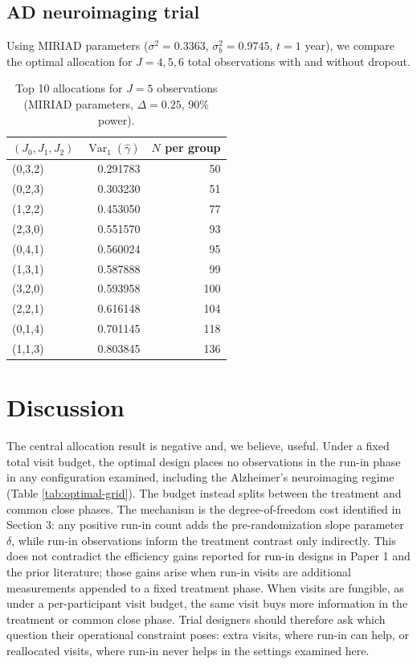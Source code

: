 \documentclass[
  11pt,
]{article}
\begin{document}
\subsection{AD neuroimaging trial}\label{ad-neuroimaging-trial}

Using MIRIAD parameters (\(\sigma^2 = 0.3363\),
\(\sigma_b^2 = 0.9745\), \(t = 1\) year), we compare the
optimal allocation for \(J = 4, 5, 6\) total observations
with and without dropout.

\begin{table}

\caption{\label{tab:ad-optimal}Top 10 allocations for $J=5$ observations (MIRIAD parameters, $\Delta=0.25$, 90\% power).}
\centering
\begin{tabular}[t]{lrr}
\toprule
$(J_0, J_1, J_2)$ & $\mathop{\mathrm{Var}}_1(\hat\gamma)$ & $N$ per group\\
\midrule
(0,3,2) & 0.291783 & 50\\
(0,2,3) & 0.303230 & 51\\
(1,2,2) & 0.453050 & 77\\
(2,3,0) & 0.551570 & 93\\
(0,4,1) & 0.560024 & 95\\
\addlinespace
(1,3,1) & 0.587888 & 99\\
(3,2,0) & 0.593958 & 100\\
(2,2,1) & 0.616148 & 104\\
(0,1,4) & 0.701145 & 118\\
(1,1,3) & 0.803845 & 136\\
\bottomrule
\end{tabular}
\end{table}

\section{Discussion}\label{discussion}

The central allocation result is negative and, we believe,
useful. Under a fixed total visit budget, the optimal
design places no observations in the run-in phase in any
configuration examined, including the Alzheimer's
neuroimaging regime (Table \ref{tab:optimal-grid}). The
budget instead splits between the treatment and common
close phases. The mechanism is the degree-of-freedom cost
identified in Section 3: any positive run-in count adds
the pre-randomization slope parameter \(\delta\), while
run-in observations inform the treatment contrast only
indirectly. This does not contradict the efficiency gains
reported for run-in designs in Paper 1 and the prior
literature; those gains arise when run-in visits are
additional measurements appended to a fixed treatment
phase. When visits are fungible, as under a
per-participant visit budget, the same visit buys more
information in the treatment or common close phase. Trial
designers should therefore ask which question their
operational constraint poses: extra visits, where run-in
can help, or reallocated visits, where run-in never helps
in the settings examined here.
\end{document}
